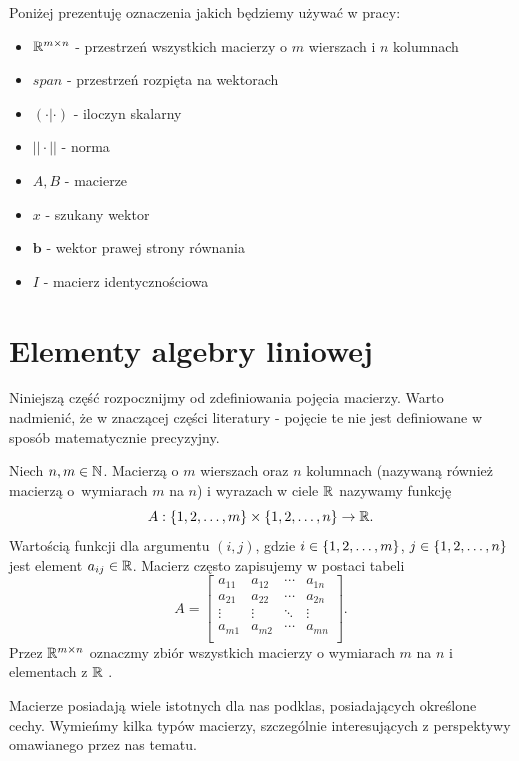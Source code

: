 \documentclass[12pt,a4paper]{report}
\newcommand{\vr}[1]{\mathbf{#1}}
\newcommand{\mx}[1]{{#1}}
\begin{document}
Poniżej prezentuję oznaczenia jakich będziemy używać w pracy: 
\begin{itemize}
\item$\mathbb{R}^{m \times n}$ - przestrzeń wszystkich macierzy o $m$ wierszach i $n$ kolumnach
\item$span$ - przestrzeń rozpięta na wektorach
\item$(\cdot |\cdot )$ - iloczyn skalarny
\item$||\cdot || $ - norma
\item$\mx{A}, \mx{B}$ - macierze
\item$x$ - szukany wektor
\item$\vr{b}$ - wektor prawej strony równania
\item$\mx{I}$ - macierz identycznościowa

\end{itemize}

\section{Elementy algebry liniowej} 

Niniejszą część rozpocznijmy od zdefiniowania pojęcia macierzy. Warto nadmienić, że w znaczącej części literatury - pojęcie te nie jest definiowane w sposób matematycznie precyzyjny.

\begin{definition}
Niech $n,m \in \mathbb{N}$. Macierzą o $m$ wierszach oraz $n$ kolumnach (nazywaną również macierzą o~wymiarach $m$ na $n$) i wyrazach w ciele $\mathbb{R}$ nazywamy funkcję 
$$
\mx{A}: \set{1,2, \ldots ,m}\times \set{1,2, \ldots ,n} \to \setR.
$$
Wartością funkcji dla argumentu $(i,j)$, gdzie $i \in \left\lbrace {1,2, \ldots ,m} \right\rbrace$, $j \in \left\lbrace {1,2, \ldots ,n} \right\rbrace$ jest element $a_{ij} \in \mathbb{R}$. Macierz często zapisujemy w postaci tabeli
$$
\mx{A} = \begin{bmatrix}
 a_{11} & a_{12} & \cdots & a_{1n} \\
         a_{21} & a_{22} & \cdots & a_{2n} \\
         \vdots & \vdots & \ddots & \vdots \\
         a_{m1} & a_{m2} & \cdots & a_{mn} \\
\end{bmatrix}.
$$
Przez $\mathbb{R}^{m \times n}$ oznaczmy zbiór wszystkich macierzy o wymiarach $m$ na $n$ i elementach z $\mathbb{R}$ .
\end{definition}

Macierze posiadają wiele istotnych dla nas podklas, posiadających określone cechy. Wymieńmy kilka typów macierzy, szczególnie interesujących z perspektywy omawianego przez nas tematu.
\end{document}
